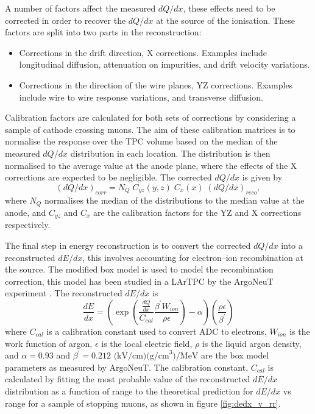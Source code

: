 A number of factors affect the measured $dQ/dx$, these effects need to be 
corrected in order to recover the $dQ/dx$ at the source of the ionisation. 
These factors are split into two parts in the \protodune{} reconstruction:
\begin{itemize}
	\item Corrections in the drift direction, X corrections. Examples include 
		longitudinal diffusion, attenuation on impurities, and drift velocity
		variations.
	\item Corrections in the direction of the wire planes, YZ corrections.
		Examples include wire to wire response variations, and transverse diffusion.
\end{itemize}
Calibration factors are calculated for both sets of corrections by considering a
sample of cathode crossing muons. The aim of these calibration matrices is to 
normalise the response over the TPC volume based on the median of the measured
$dQ/dx$ distribution in each location. The distribution is then normalised to 
the average value at the anode plane, where the effects of the X corrections are
expected to be negligible. The corrected $dQ/dx$ is given by
\begin{equation}
	\left( dQ/dx \right)_{corr} = N_Q \; C_{yz}(y, z) \; C_x(x) \; \left( dQ/dx
	\right)_{reco},
\end{equation}
where $N_Q$ normalises the median of the distributions to the median value at
the anode, and $C_{yz}$ and $C_{x}$ are the calibration factors for the YZ and 
X corrections respectively.

The final step in energy reconstruction is to convert the corrected $dQ/dx$ into
a reconstructed $dE/dx$, this involves accounting for electron--ion
recombination at the source. The modified box model is used to model the
recombination correction, this model has been studied in a LArTPC by the 
ArgoNeuT experiment \cite{Acciarri2013a}. The reconstructed $dE/dx$ is 
\begin{equation}
	\frac{dE}{dx} = \left( \exp \left( \frac{\frac{dQ}{dx}}{C_{cal}} \frac{\beta^\prime
	W_{ion}}{\rho \epsilon} \right) - \alpha \right)
	\left( \frac{\rho \epsilon}{\beta^\prime} \right)
\end{equation}
where $C_{cal}$ is a calibration constant used to convert ADC to electrons,
$W_{ion}$ is the work function of argon, $\epsilon$ is the local electric field,
$\rho$ is the liquid argon density, and \(\alpha = 0.93\) and 
\(\beta^\prime = 0.212 \mbox{ (kV/cm)(g/cm}^3) / \mbox{MeV}\) are the box model 
parameters as measured by ArgoNeuT. The calibration constant, $C_{cal}$ is 
calculated by fitting the most probable value of the reconstructed $dE/dx$ 
distribution as a function of range to the theoretical prediction for $dE/dx$ 
vs range for a sample of stopping muons, as shown in figure \ref{fig:dedx_v_rr}.

